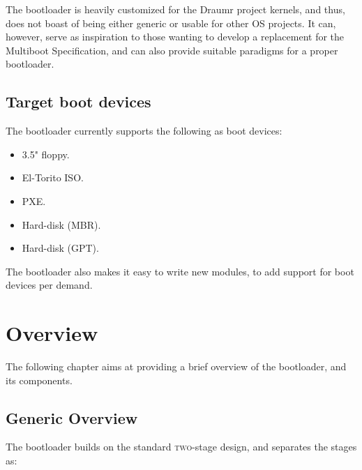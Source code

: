 \documentclass[11pt,a4paper,oneside]{report}
\begin{document}
The bootloader is heavily customized for the Draumr project kernels, and thus, does not boast of being either generic or usable for other OS projects. It can, however, serve as inspiration to those wanting to develop a replacement for the Multiboot Specification, and can also provide suitable paradigms for a proper bootloader.

\section{Target boot devices}

The bootloader currently supports the following as boot devices:

\begin{itemize}
    \item 3.5" floppy.
    \item El-Torito ISO.
    \item PXE.
    \item Hard-disk (MBR).
    \item Hard-disk (GPT).
\end{itemize}

The bootloader also makes it easy to write new modules, to add support for boot devices per demand.

\chapter{Overview}

The following chapter aims at providing a brief overview of the bootloader, and its components.

\section{Generic Overview}
\label{Generic Overview}

The bootloader builds on the standard \textsc{two}-stage design, and separates the stages as:
\end{document}
